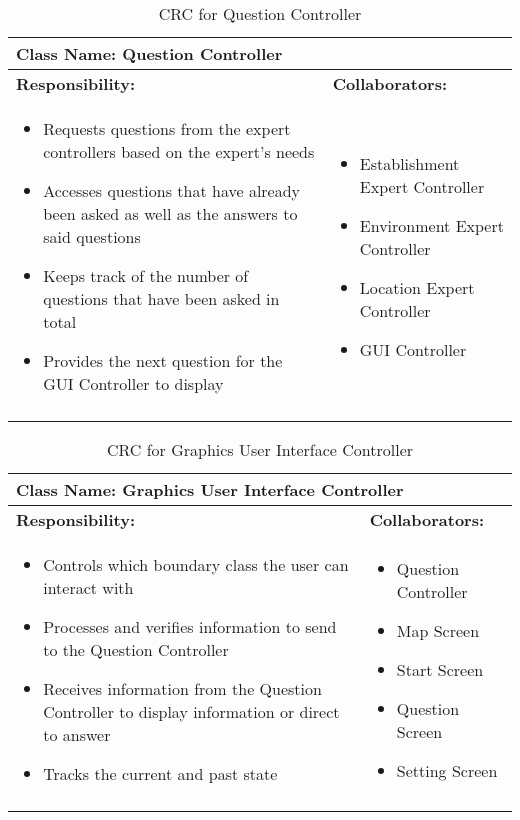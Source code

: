 \documentclass[titlepage]{article}
\begin{document}
	
	\begin{longtable}{| p{} | p{} |}
			\hline
			 \multicolumn{2}{|l|}{\textbf{Class Name: Question Controller}} \\
			\hline
			\textbf{Responsibility:} & \textbf{Collaborators:} \\
			\hline
				\begin{itemize}
					\item Requests questions from the expert controllers based on the expert's needs
					\item Accesses questions that have already been asked as well as the answers to said questions
					\item Keeps track of the number of questions that have been asked in total
					\item Provides the next question for the GUI Controller to display
				\end{itemize} & 
				\begin{itemize}
					\item Establishment Expert Controller
					\item Environment Expert Controller
					\item Location Expert Controller
					\item GUI Controller
				\end{itemize} 
				\\
			\hline
		\caption{CRC for Question Controller}
	\end{longtable}
	

	\begin{longtable}{| p{} | p{} |}
			\hline
			 \multicolumn{2}{|l|}{\textbf{Class Name: Graphics User Interface Controller}} \\
			\hline
			\textbf{Responsibility:} & \textbf{Collaborators:} \\
			\hline
				\begin{itemize}
					\item Controls which boundary class the user can interact with
					\item Processes and verifies information to send to the Question Controller
					\item Receives information from the Question Controller to display information or direct to answer
					\item Tracks the current and past state
				\end{itemize} & 
				\begin{itemize}
					\item Question Controller
					\item Map Screen
					\item Start Screen
					\item Question Screen
					\item Setting Screen
				\end{itemize} 
				\\
			\hline
		\caption{CRC for Graphics User Interface Controller}
	\end{longtable}
	
\end{document}

